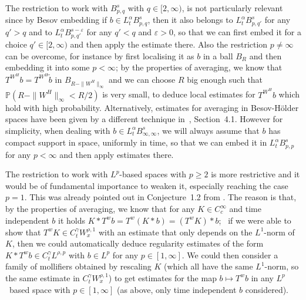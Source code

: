 \documentclass[10pt]{article}
\begin{document}
\begin{remark}
  The restriction to work with $B^s_{p, q}$ with $q \in [2, \infty)$, is not
  particularly relevant since by Besov embedding if $b \in L^{\alpha}_t
  B^s_{p, q}$, then it also belongs to $L^{\alpha}_t B^s_{p, q'}$ for any $q'
  > q$ and to $L^{\alpha}_t B^{s - \varepsilon}_{p, q'}$ for any $q' < q$ and
  $\varepsilon > 0$, so that we can first embed it for a choice $q' \in [2,
  \infty)$ and then apply the estimate there. Also the restriction $p \neq
  \infty$ can be overcome, for instance by first localising it as \~{$b$} in a
  ball $B_R$ and then embedding it into some $p < \infty$; by the properties
  of averaging, we know that $T^{W^H} b = T^{W^H} \tilde{b}$ in $B_{R - \| W^H
  \|_{\infty}}$ and we can choose $R$ big enough such that $\mathbb{P} (R - \|
  W^H \|_{\infty} < R / 2)$ is very small, to deduce local estimates for
  $T^{W^H} b$ which hold with high probability. Alternatively, estimates for
  averaging in Besov-H\"{o}lder spaces have been given by a different
  technique in~{\cite{catelliergubinelli}}, Section~4.1. However for
  simplicity, when dealing with $b \in L^{\alpha}_t B^s_{\infty, \infty}$, we
  will always assume that $b$ has compact support in space, uniformly in time,
  so that we can embed it in $L^{\alpha}_t B^s_{p, p}$ for any $p < \infty$
  and then apply estimates there.
\end{remark}

\begin{remark}
  \label{sec3.3 remark limitation}The restriction to work with
  $L^p$\mbox{-}based spaces with $p \geqslant 2$ is more restrictive and it
  would be of fundamental importance to weaken it, especially reaching the
  case $p = 1$. This was already pointed out in Conjecture~1.2 from
  {\cite{catelliergubinelli}}. The reason is that, by the properties of
  averaging, we know that for any $K \in C^{\infty}_c$ and time independent
  $b$ it holds $K \ast T^w b = T^w (K \ast b) = (T^w K) \ast b$; \ if we were
  able to show that $T^w K \in C^{\gamma}_t W^{\rho, 1}_x$ with an estimate
  that only depends on the $L^1$\mbox{-}norm of $K$, then we could
  automatically deduce regularity estimates of the form $K \ast T^w b \in
  C^{\gamma}_t L^{\rho, p}$ with $b \in L^p$ for any $p \in [1, \infty]$. We
  could then consider a family of mollifiers obtained by rescaling $K$ (which
  all have the same $L^1$\mbox{-}norm, so the same estimate in $C^{\gamma}_t
  W^{\rho, 1}_x$) to get estimates for the map $b \mapsto T^w b$ in any
  $L^p$~based space with $p \in [1, \infty]$ (as above, only time independent
  $b$ considered).
\end{remark}
\end{document}
